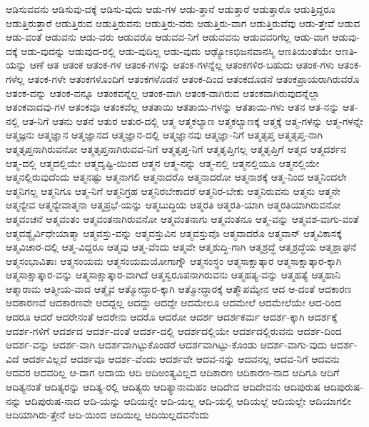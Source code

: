 {ಆಡಿಸುವವನು
ಆಡಿಸುವು-ದಕ್ಕೆ
ಆಡಿಸು-ವುದು
ಆಡು-ಗಳ
ಆಡು-ತ್ತಾನೆ
ಆಡುತ್ತಾರೆ
ಆಡುತ್ತಾರೊ
ಆಡುತ್ತಿದ್ದರೂ
ಆಡುತ್ತಿರುತ್ತಾರೆ
ಆಡುತ್ತಿರುವ
ಆಡುತ್ತಿರುವನು
ಆಡುತ್ತಿರು-ವರು
ಆಡುತ್ತಿರು-ವಾಗ
ಆಡುತ್ತಿರುವೆವು
ಆಡು-ತ್ತೇವೆ
ಆಡುವ
ಆಡು-ವಂತೆ
ಆಡುವನು
ಆಡು-ವರು
ಆಡುವರೊ
ಆಡುವವ-ನಿಗೆ
ಆಡುವವನು
ಆಡುವವರಿಗೆಲ್ಲ
ಆಡು-ವಾಗ
ಆಡುವು-ದಕ್ಕೆ
ಆಡು-ವುದನ್ನು
ಆಡುವುದ-ರಲ್ಲಿ
ಆಡು-ವುದಿಲ್ಲ
ಆಡು-ವುದು
ಆಢ್ಯೋಽಭಿಜನವಾನಸ್ಮಿ
ಆಣತಿಯಂತೆಯೇ
ಆಣತಿ-ಯನ್ನು
ಆಣೆ
ಆತ
ಆತಂಕ
ಆತಂಕ-ಗಳ
ಆತಂಕ-ಗಳನ್ನು
ಆತಂಕ-ಗಳನ್ನೆಲ್ಲ
ಆತಂಕಗಳಿರ-ಬಹುದು
ಆತಂಕ-ಗಳು
ಆತಂಕ-ಗಳೆಲ್ಲ
ಆತಂಕ-ಗಳೇ
ಆತಂಕಗಳೊಂದಿಗೆ
ಆತಂಕಗಳೊಡನೆ
ಆತಂಕ-ದಿಂದ
ಆತಂಕದೊಡನೆ
ಆತಂಕಪ್ರಾಯರಾಗಿರುವರೊ
ಆತಂಕ-ವನ್ನು
ಆತಂಕ-ವನ್ನೂ
ಆತಂಕವನ್ನೆಲ್ಲ
ಆತಂಕ-ವಾಗಿ
ಆತಂಕ-ವಾಗಿರುವ
ಆತಂಕವಾಗಿರುವುದನ್ನೆಲ್ಲಾ
ಆತಂಕವಾದವು-ಗಳ
ಆತಂಕವೂ
ಆತಂಕವೆಲ್ಲ
ಆತತಾಯಿ
ಆತತಾಯಿ-ಗಳನ್ನು
ಆತತಾಯಿ-ಗಳು
ಆತನ
ಆತ-ನನ್ನು
ಆತ-ನಲ್ಲಿ
ಆತ-ನಿಗೆ
ಆತನು
ಆತನೆ
ಆತುರ
ಆತುರ-ದಲ್ಲಿ
ಆತ್ಮ
ಆತ್ಮಕಲ್ಯಾಣ
ಆತ್ಮಕಲ್ಯಾಣಕ್ಕೆ
ಆತ್ಮಕ್ಕೆ
ಆತ್ಮ-ಗಳನ್ನು
ಆತ್ಮ-ಗಳನ್ನೇ
ಆತ್ಮಜ್ಞನು
ಆತ್ಮಜ್ಞಾನ
ಆತ್ಮಜ್ಞಾನದ
ಆತ್ಮಜ್ಞಾನ-ದಲ್ಲಿ
ಆತ್ಮಜ್ಞಾನವು
ಆತ್ಮಜ್ಞಾ-ನಿಗೆ
ಆತ್ಮತೃಪ್ತ
ಆತ್ಮತೃಪ್ತ-ನಾಗಿ
ಆತ್ಮತೃಪ್ತನಾಗಿರುವನೋ
ಆತ್ಮತೃಪ್ತನಾಗಿರುವವ-ನಿಗೆ
ಆತ್ಮತೃಪ್ತ-ನಿಗೆ
ಆತ್ಮತೃಪ್ತಿಗಲ್ಲ
ಆತ್ಮತೃಪ್ತಿಗೆ
ಆತ್ಮದ
ಆತ್ಮದರ್ಶನ
ಆತ್ಮ-ದಲ್ಲಿ
ಆತ್ಮದಲ್ಲಿಯೇ
ಆತ್ಮದೃಷ್ಟಿ-ಯಿಂದ
ಆತ್ಮನ
ಆತ್ಮ-ನನ್ನು
ಆತ್ಮ-ನಲ್ಲಿ
ಆತ್ಮನಲ್ಲಿಯೂ
ಆತ್ಮನಲ್ಲಿಯೇ
ಆತ್ಮನಲ್ಲಿರುವುದೆಂದು
ಆತ್ಮನಷ್ಟು
ಆತ್ಮನಾಗಲಿ
ಆತ್ಮನಾದರೊ
ಆತ್ಮನಾದರೋ
ಆತ್ಮನಾಶಕ್ಕೆ
ಆತ್ಮ-ನಿಂದ
ಆತ್ಮನಿಂದಲೇ
ಆತ್ಮನಿಗಲ್ಲ
ಆತ್ಮನಿಗೂ
ಆತ್ಮ-ನಿಗೆ
ಆತ್ಮನಿಗ್ರಹ
ಆತ್ಮನಿರಬೇಕಾದರೆ
ಆತ್ಮನಿರ-ಬೇಕು
ಆತ್ಮನಿರುವನು
ಆತ್ಮನು
ಆತ್ಮನೇ
ಆತ್ಮನ್ಯೇವ
ಆತ್ಮನ್ಯೇವಾತ್ಮನಾ
ಆತ್ಮಪ್ರಭೆ-ಯನ್ನು
ಆತ್ಮಬುದ್ಧಿಯ
ಆತ್ಮರತಿ
ಆತ್ಮರತಿ-ಯಾಗಿ
ಆತ್ಮರತಿಯಾಗಿರುವನೋ
ಆತ್ಮವಂಚನೆ
ಆತ್ಮವಂತಂ
ಆತ್ಮವಂತನಾಗಿರುವನೋ
ಆತ್ಮವಂತನಾಗು
ಆತ್ಮವಂತನೂ
ಆತ್ಮ-ವನ್ನು
ಆತ್ಮವಶ-ವಾಗು-ವಂತೆ
ಆತ್ಮವಶ್ಯೈರ್ವಿಧೇಯಾತ್ಮಾ
ಆತ್ಮವಸ್ತು-ವನ್ನು
ಆತ್ಮವಸ್ತುವಿನ
ಆತ್ಮವಸ್ತುವೊ
ಆತ್ಮವಾದರೊ
ಆತ್ಮವಾನ್
ಆತ್ಮವಿಕಾಸಕ್ಕೆ
ಆತ್ಮವಿಚಾರ-ದಲ್ಲಿ
ಆತ್ಮ-ವಿದ್ದರೂ
ಆತ್ಮವು
ಆತ್ಮ-ವೆಂದು
ಆತ್ಮವೇ
ಆತ್ಮಶುದ್ಧಿ-ಗಾಗಿ
ಆತ್ಮಶ್ರದ್ಧೆ
ಆತ್ಮಶ್ರದ್ಧೆಯ
ಆತ್ಮಶ್ಲಾಘನೆ
ಆತ್ಮಸಂಭಾವಿತಾಃ
ಆತ್ಮಸಂಯಮ
ಆತ್ಮಸಂಯಮಯೋಗಾಗ್ನೌ
ಆತ್ಮಸಂಸ್ಥಂ
ಆತ್ಮಸಾಕ್ಷಾತ್ಕಾರ
ಆತ್ಮಸಾಕ್ಷಾತ್ಕಾರ-ಕ್ಕಾಗಿ
ಆತ್ಮಸಾಕ್ಷಾತ್ಕಾರ-ವನ್ನು
ಆತ್ಮಸಾಕ್ಷಾತ್ಕಾರ-ವಾಗಿದೆ
ಆತ್ಮಸ್ವರೂಪನಾಗಿರುವನು
ಆತ್ಮಹತ್ಯ-ವನ್ನು
ಆತ್ಮಹತ್ಯೆ
ಆತ್ಮಹಾನಿ
ಆತ್ಮಾರಾಮ
ಆತ್ಮೀಯ-ವಾದ
ಆತ್ಮೈವ
ಆತ್ಮೋದ್ಧಾರ-ಕ್ಕಾಗಿ
ಆತ್ಮೋದ್ಧಾರಕ್ಕೆ
ಆತ್ಮೌಪಮ್ಯೇನ
ಆದ
ಆ-ದಂತೆ
ಆದಕಾರಣ
ಆದಕಾರಣವೆ
ಆದಕಾರಣವೇ
ಆದದ್ದಲ್ಲ
ಆದದ್ದು
ಆದದ್ದೇ
ಆದಮೇಲೂ
ಆದಮೇಲೆ
ಆದಮೇಲೆಯೇ
ಆದ-ರಿಂದ
ಆದರೂ
ಆದರೆ
ಆದರೇನಂತೆ
ಆದರೇನು
ಆದರೊ
ಆದರೋ
ಆದರ್ಶ
ಆದರ್ಶಕರ್ಮ
ಆದರ್ಶ-ಕ್ಕಾಗಿ
ಆದರ್ಶಕ್ಕೆ
ಆದರ್ಶ-ಗಳಿಗೆ
ಆದರ್ಶದ
ಆದರ್ಶ-ದಂತೆ
ಆದರ್ಶ-ದಲ್ಲಿ
ಆದರ್ಶದಲ್ಲಿಯೇ
ಆದರ್ಶದಲ್ಲಿರುವನು
ಆದರ್ಶ-ದಿಂದ
ಆದರ್ಶ-ವನ್ನು
ಆದರ್ಶ-ವಾಗಿ
ಆದರ್ಶವಾಗಿಟ್ಟುಕೊಂಡರೆ
ಆದರ್ಶವಾಗಿಟ್ಟು-ಕೊಂಡು
ಆದರ್ಶ-ವಾಗು-ವುದು
ಆದರ್ಶ-ವಿದೆ
ಆದರ್ಶವಿಲ್ಲದೆ
ಆದರ್ಶವೂ
ಆದರ್ಶ-ವೆಂದು
ಆದರ್ಶವೇ
ಆದವ-ನನ್ನು
ಆದವನಲ್ಲ
ಆದವ-ನಿಗೆ
ಆದವನು
ಆದವರ
ಆದವರಿಲ್ಲ
ಆ-ದಾಗ
ಆದಾಯ
ಆದಿ
ಆದಿಅಂತ್ಯವಿಲ್ಲದ
ಆದಿಕಾರಣ
ಆದಿಕಾರಣ-ನಾದ
ಆದಿಗೂ
ಆದಿಗೆ
ಆದಿತ್ಯನಂತೆ
ಆದಿತ್ಯರನ್ನು
ಆದಿತ್ಯ-ರಲ್ಲಿ
ಆದಿತ್ಯರು
ಆದಿತ್ಯಾನಾಮಹಂ
ಆದಿದೇವ
ಆದಿದೇವನು
ಆದಿಪುರುಷ
ಆದಿಪುರುಷ-ನನ್ನು
ಆದಿಪುರುಷ-ನಾದ
ಆದಿ-ಯನ್ನು
ಆದಿಯನ್ನೇ
ಆದಿ-ಯಲ್ಲ
ಆದಿ-ಯಲ್ಲಿ
ಆದಿಯಲ್ಲೆ
ಆದಿಯಲ್ಲೇ
ಆದಿಯಾಗಲೀ
ಆದಿಯಾಗಿರು-ತ್ತೇನೆ
ಆದಿ-ಯಿಂದ
ಆದಿಯಿಲ್ಲ
ಆದಿಯಿಲ್ಲದವನೆಂದು
}
